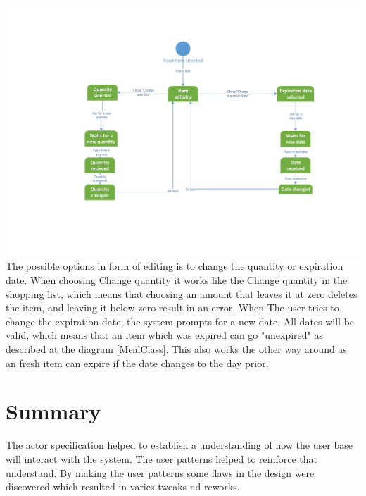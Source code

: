 \includegraphics[width=1.0\textwidth]{ApplicationDomain/spEditInventory.pdf} \label{spEditInventory}
The possible options in form of editing is to change the quantity or expiration date. 
When choosing Change quantity it works like the Change quantity in the shopping list, which means that choosing an amount that leaves it at zero deletes the item, and leaving it below zero result in an error. When The user tries to change the expiration date, the system prompts for a new date. All dates will be valid, which means that an item which was expired can go "unexpired" as described at the diagram \ref{MealClass}. This also works the other way around as an fresh item can expire if the date changes to the day prior.


\section*{Summary}
The actor specification helped to establish a understanding of how the user base will interact with the system. The user patterns helped to reinforce that understand. By making the user patterns some flaws in the design were discovered which resulted in varies tweaks nd reworks.